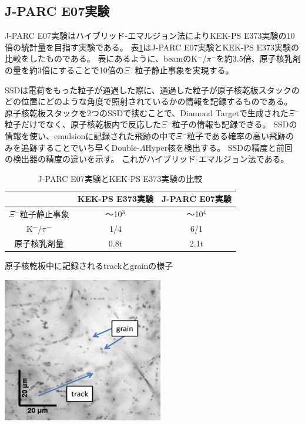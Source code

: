 \documentclass[12pt,a4paper]{jarticle}
\begin{document}
\subsection{J-PARC E07実験}
J-PARC E07実験はハイブリッド-エマルジョン法によりKEK-PS E373実験の10倍の統計量を目指す実験である。
表\ref{tab:compare_E07_E373}はJ-PARC E07実験とKEK-PS E373実験の比較をしたものである。
表にあるように、beamのK$^-$/$\pi$$^-$を約3.5倍、原子核乳剤の量を約3倍にすることで10倍の$\Xi$$^-$粒子静止事象を実現する。
\par
SSDは電荷をもった粒子が通過した際に、通過した粒子が原子核乾板スタックのどの位置にどのような角度で照射されているかの情報を記録するものである。
原子核乾板スタックを2つのSSDで挟むことで、Diamond Targetで生成された$\Xi$$^-$粒子だけでなく、原子核乾板内で反応した$\Xi$$^-$粒子の情報も記録できる。
SSDの情報を使い、emulsionに記録された飛跡の中で$\Xi$$^-$粒子である確率の高い飛跡のみを追跡することでいち早くDouble-$\Lambda$Hyper核を検出する。
SSDの精度と前回の検出器の精度の違いを示す。
これがハイブリッド-エマルジョン法である。
\begin{table}[htbp]
\centering
\caption{J-PARC E07実験とKEK-PS E373実験の比較\label{tab:compare_E07_E373}}
\begin{tabular}{c|c|c}
　　　&KEK-PS E373実験&J-PARC E07実験\\
\hline
\hline
$\Xi$$^-$粒子静止事象 & ～10$^3$    & ～10$^4$  \\
K$^-$/$\pi$$^-$ & 1/4  & 6/1 \\
原子核乳剤量 & 0.8t & 2.1t  \\
\hline
\end{tabular}
\end{table}
\begin{table}[htbp]
\centering
\caption{原子核乾板中に記録されるtrackとgrainの様子\label{tab:grain_track}}
\begin{center}
    \includegraphics[width=70mm]{grainfog.png}
\end{center}
\end{table}
\end{document}
